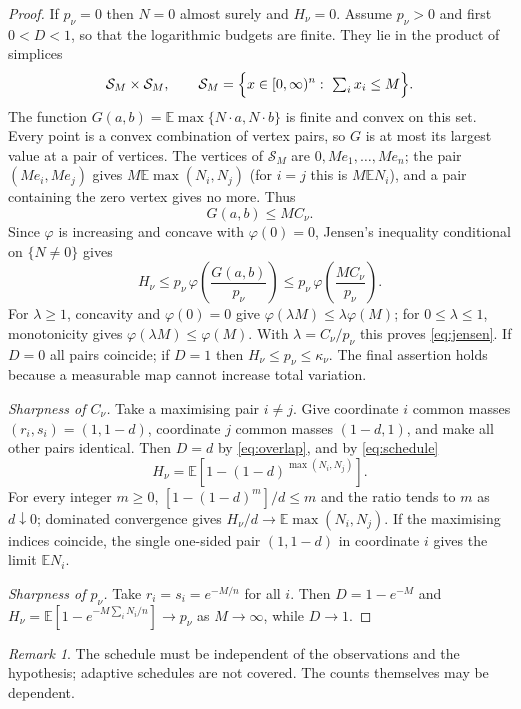 \documentclass[11pt,a4paper]{article}
\theoremstyle{definition}\newtheorem{definition}[theorem]{Definition}
\theoremstyle{remark}\newtheorem{remark}[theorem]{Remark}
\newcommand{\E}{\mathbb E}
\newcommand{\ph}{\varphi}
\begin{document}
\begin{proof}
If $p_\nu=0$ then $N=0$ almost surely and $H_\nu=0$. Assume $p_\nu>0$ and first $0<D<1$, so that the logarithmic budgets are finite. They lie in the product of simplices
\[
\mathcal S_M\times\mathcal S_M,\qquad
\mathcal S_M=\Bigl\{x\in[0,\infty)^n:\ \textstyle\sum_i x_i\le M\Bigr\}.
\]
The function $G(a,b)=\E\max\{N\cdot a,N\cdot b\}$ is finite and convex on this set. Every point is a convex combination of vertex pairs, so $G$ is at most its largest value at a pair of vertices. The vertices of $\mathcal S_M$ are $0,Me_1,\ldots,Me_n$; the pair $(Me_i,Me_j)$ gives $M\E\max(N_i,N_j)$ (for $i=j$ this is $M\E N_i$), and a pair containing the zero vertex gives no more. Thus
\begin{equation}\label{eq:simplex}
G(a,b)\le MC_\nu.
\end{equation}
Since $\ph$ is increasing and concave with $\ph(0)=0$, Jensen's inequality conditional on $\{N\ne0\}$ gives
\[
H_\nu\le p_\nu\,\ph\!\left(\frac{G(a,b)}{p_\nu}\right)
       \le p_\nu\,\ph\!\left(\frac{MC_\nu}{p_\nu}\right).
\]
For $\lambda\ge1$, concavity and $\ph(0)=0$ give $\ph(\lambda M)\le\lambda\ph(M)$; for $0\le\lambda\le1$, monotonicity gives $\ph(\lambda M)\le\ph(M)$. With $\lambda=C_\nu/p_\nu$ this proves \eqref{eq:jensen}. If $D=0$ all pairs coincide; if $D=1$ then $H_\nu\le p_\nu\le\kappa_\nu$. The final assertion holds because a measurable map cannot increase total variation.

\emph{Sharpness of $C_\nu$.} Take a maximising pair $i\ne j$. Give coordinate $i$ common masses $(r_i,s_i)=(1,1-d)$, coordinate $j$ common masses $(1-d,1)$, and make all other pairs identical. Then $D=d$ by \eqref{eq:overlap}, and by \eqref{eq:schedule}
\begin{equation}\label{eq:exactpair}
H_\nu=\E\left[1-(1-d)^{\max(N_i,N_j)}\right].
\end{equation}
For every integer $m\ge0$, $[1-(1-d)^m]/d\le m$ and the ratio tends to $m$ as $d\downarrow0$; dominated convergence gives $H_\nu/d\to\E\max(N_i,N_j)$. If the maximising indices coincide, the single one-sided pair $(1,1-d)$ in coordinate $i$ gives the limit $\E N_i$.

\emph{Sharpness of $p_\nu$.} Take $r_i=s_i=e^{-M/n}$ for all $i$. Then $D=1-e^{-M}$ and
$H_\nu=\E[1-e^{-M\sum_iN_i/n}]\to p_\nu$ as $M\to\infty$, while $D\to1$.
\end{proof}

\begin{remark}
The schedule must be independent of the observations and the hypothesis; adaptive schedules are not covered. The counts themselves may be dependent.
\end{remark}
\end{document}
